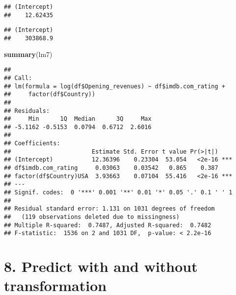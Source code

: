 \documentclass[
]{article}
\newenvironment{Shaded}{\begin{snugshade}}{\end{snugshade}}
\newcommand{\DecValTok}[1]{\textcolor[rgb]{0.00,0.00,0.81}{#1}}
\newcommand{\FloatTok}[1]{\textcolor[rgb]{0.00,0.00,0.81}{#1}}
\newcommand{\KeywordTok}[1]{\textcolor[rgb]{0.13,0.29,0.53}{\textbf{#1}}}
\newcommand{\NormalTok}[1]{#1}
\newcommand{\OperatorTok}[1]{\textcolor[rgb]{0.81,0.36,0.00}{\textbf{#1}}}
\newcommand{\StringTok}[1]{\textcolor[rgb]{0.31,0.60,0.02}{#1}}
\begin{document}
\begin{verbatim}
## (Intercept) 
##    12.62435
\end{verbatim}

\begin{Shaded}
\end{Shaded}

\begin{verbatim}
## (Intercept) 
##    303868.9
\end{verbatim}

\begin{Shaded}
\begin{Highlighting}[]
\KeywordTok{summary}\NormalTok{(lm7)}
\end{Highlighting}
\end{Shaded}

\begin{verbatim}
## 
## Call:
## lm(formula = log(df$Opening_revenues) ~ df$imdb.com_rating + 
##     factor(df$Country))
## 
## Residuals:
##     Min      1Q  Median      3Q     Max 
## -5.1162 -0.5153  0.0794  0.6712  2.6016 
## 
## Coefficients:
##                       Estimate Std. Error t value Pr(>|t|)    
## (Intercept)           12.36396    0.23304  53.054   <2e-16 ***
## df$imdb.com_rating     0.03063    0.03542   0.865    0.387    
## factor(df$Country)USA  3.93663    0.07104  55.416   <2e-16 ***
## ---
## Signif. codes:  0 '***' 0.001 '**' 0.01 '*' 0.05 '.' 0.1 ' ' 1
## 
## Residual standard error: 1.131 on 1031 degrees of freedom
##   (119 observations deleted due to missingness)
## Multiple R-squared:  0.7487, Adjusted R-squared:  0.7482 
## F-statistic:  1536 on 2 and 1031 DF,  p-value: < 2.2e-16
\end{verbatim}

\hypertarget{predict-with-and-without-transformation}{%
\section{8. Predict with and without
transformation}\label{predict-with-and-without-transformation}}
\end{document}
